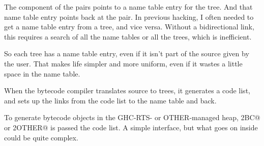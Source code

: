 The \verb@Name@ component of the pairs points to a name 
table entry for the tree.  And that name table entry points
back at the pair.  In previous hacking, I often needed to 
get a name table entry from a tree, and vice versa.  Without a
bidirectional link, this requires a search of all the name tables
or all the trees, which is inefficient.

So each tree has a name table entry, even if it isn't part of
the source given by the user.  That makes life simpler and more
uniform, even if it wastes a little space in the name table.

When the bytecode compiler translates source to trees, it 
generates a code list, and sets up the links from the code
list to the name table and back.

To generate bytecode objects in the GHC-RTS- or OTHER-managed
heap, \verb@stg2BC@ or \verb@stg2OTHER@ is passed the code list.
A simple interface, but what goes on inside could be quite complex.
